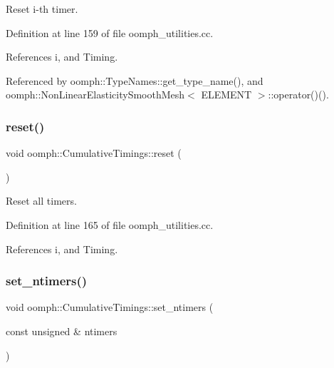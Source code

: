Reset i-\/th timer. 



Definition at line 159 of file oomph\+\_\+utilities.\+cc.



References i, and Timing.



Referenced by oomph\+::\+Type\+Names\+::get\+\_\+type\+\_\+name(), and oomph\+::\+Non\+Linear\+Elasticity\+Smooth\+Mesh$<$ E\+L\+E\+M\+E\+N\+T $>$\+::operator()().

\mbox{\label{namespaceoomph_1_1CumulativeTimings_a15855a46d3acb353e3ca84c8d696d57d}} 
\subsubsection{\texorpdfstring{reset()}{reset()}\hspace{0.1cm}{\footnotesize\ttfamily [2/2]}}
{\footnotesize\ttfamily void oomph\+::\+Cumulative\+Timings\+::reset (\begin{DoxyParamCaption}{ }\end{DoxyParamCaption})}



Reset all timers. 



Definition at line 165 of file oomph\+\_\+utilities.\+cc.



References i, and Timing.

\mbox{\label{namespaceoomph_1_1CumulativeTimings_a49a6558826c7842f0e14dbdaccc3ed01}} 
\subsubsection{\texorpdfstring{set\+\_\+ntimers()}{set\_ntimers()}}
{\footnotesize\ttfamily void oomph\+::\+Cumulative\+Timings\+::set\+\_\+ntimers (\begin{DoxyParamCaption}\item[{const unsigned \&}]{ntimers }\end{DoxyParamCaption})}



